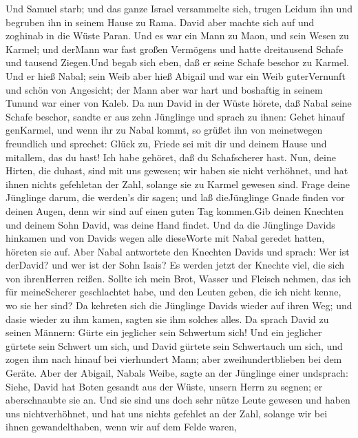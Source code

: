  Und Samuel starb; und das ganze Israel versammelte sich,
trugen Leidum ihn und begruben ihn in seinem Hause zu Rama. David aber
machte sich auf und zoghinab in die Wüste Paran.  Und es war
ein Mann zu Maon, und sein Wesen zu Karmel; und derMann war fast großen
Vermögens und hatte dreitausend Schafe und tausend Ziegen.Und begab sich
eben, daß er seine Schafe beschor zu Karmel.  Und er hieß
Nabal; sein Weib aber hieß Abigail und war ein Weib guterVernunft und
schön von Angesicht; der Mann aber war hart und boshaftig in seinem
Tunund war einer von Kaleb.  Da nun David in der Wüste
hörete, daß Nabal seine Schafe beschor,  sandte er aus zehn
Jünglinge und sprach zu ihnen: Gehet hinauf genKarmel, und wenn ihr zu
Nabal kommt, so grüßet ihn von meinetwegen freundlich  und
sprechet: Glück zu, Friede sei mit dir und deinem Hause und mitallem,
das du hast!  Ich habe gehöret, daß du Schafscherer hast.
Nun, deine Hirten, die duhast, sind mit uns gewesen; wir haben sie nicht
verhöhnet, und hat ihnen nichts gefehletan der Zahl, solange sie zu
Karmel gewesen sind.  Frage deine Jünglinge darum, die
werden's dir sagen; und laß dieJünglinge Gnade finden vor deinen Augen,
denn wir sind auf einen guten Tag kommen.Gib deinen Knechten und deinem
Sohn David, was deine Hand findet.  Und da die Jünglinge
Davids hinkamen und von Davids wegen alle dieseWorte mit Nabal geredet
hatten, höreten sie auf.  Aber Nabal antwortete den
Knechten Davids und sprach: Wer ist derDavid? und wer ist der Sohn
Isais? Es werden jetzt der Knechte viel, die sich von ihrenHerren
reißen.  Sollte ich mein Brot, Wasser und Fleisch nehmen,
das ich für meineScherer geschlachtet habe, und den Leuten geben, die
ich nicht kenne, wo sie her sind?  Da kehreten sich die
Jünglinge Davids wieder auf ihren Weg; und dasie wieder zu ihm kamen,
sagten sie ihm solches alles.  Da sprach David zu seinen
Männern: Gürte ein jeglicher sein Schwertum sich! Und ein jeglicher
gürtete sein Schwert um sich, und David gürtete sein Schwertauch um
sich, und zogen ihm nach hinauf bei vierhundert Mann; aber
zweihundertblieben bei dem Geräte.  Aber der Abigail,
Nabals Weibe, sagte an der Jünglinge einer undsprach: Siehe, David hat
Boten gesandt aus der Wüste, unsern Herrn zu segnen; er aberschnaubte
sie an.  Und sie sind uns doch sehr nütze Leute gewesen und
haben uns nichtverhöhnet, und hat uns nichts gefehlet an der Zahl,
solange wir bei ihnen gewandelthaben, wenn wir auf dem Felde waren,
